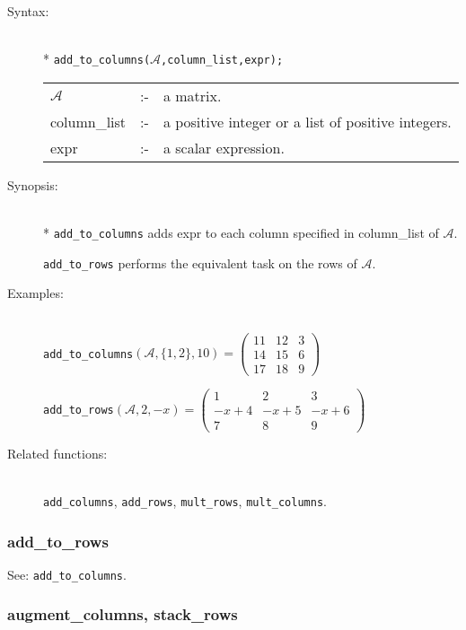 \begin{description}
  \item[Syntax:]\mbox{}\\*
\texttt{add\_to\_columns($\mathcal{A}$,column\_list,expr);}\\[2mm]
\begin{tabular}{l l l}
$\mathcal{A}$   &:-& a matrix. \\
column\_list &:-& a positive integer or a list of positive integers. \\
expr        &:-& a scalar expression.
\end{tabular}

\item[Synopsis:]\mbox{}\\*
\texttt{add\_to\_columns} adds expr to each column specified in
column\_list of $\mathcal{A}$.

\texttt{add\_to\_rows} performs the equivalent task on the rows of
$\mathcal{A}$.

\item[Examples:]\mbox{}\\
  \texttt{add\_to\_columns}\((\mathcal{A},\{1,2\},10)  =
  \begin{pmatrix} 11 & 12 & 3 \\ 14 & 15 & 6 \\ 17 & 18 & 9 \end{pmatrix}\)

  \texttt{add\_to\_rows}\((\mathcal{A},2,-x)  =
  \begin{pmatrix} 1 & 2 & 3 \\ -x+4 & -x+5 & -x+6 \\ 7 & 8 & 9 \end{pmatrix}\)

\item[Related functions:]\mbox{}\\
\texttt{add\_columns}, \texttt{add\_rows}, \texttt{mult\_rows},
\texttt{mult\_columns}.
\end{description}

\subsubsection{add\_to\_rows}
\label{linalg:add_to_rows}

See: \texttt{add\_to\_columns}.


\subsubsection{augment\_columns, stack\_rows}
\label{linalg:augment_columns}

